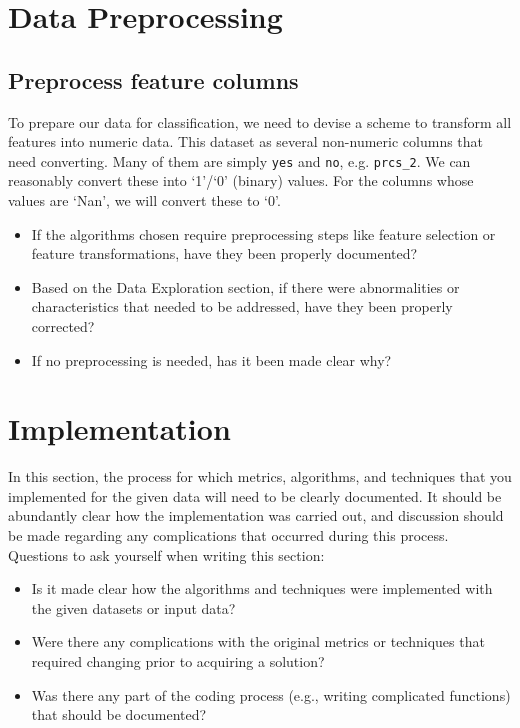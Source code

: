\section*{Data Preprocessing}

\subsection*{Preprocess feature columns}

To prepare our data for classification, we need to devise a scheme to transform all features into numeric data. This dataset as several non-numeric columns that need converting. Many of them are simply \texttt{yes} and \texttt{no}, e.g. \texttt{prcs\_2}. We can reasonably convert these into `1'/`0' (binary) values. For the columns whose values are `Nan', we will convert these to `0'.
\begin{itemize}%
\item If the algorithms chosen require preprocessing steps like feature selection or feature transformations, have they been properly documented?
\item Based on the Data Exploration section, if there were abnormalities or characteristics that needed to be addressed, have they been properly corrected?
\item If no preprocessing is needed, has it been made clear why?
\end{itemize}

\section*{Implementation}
In this section, the process for which metrics, algorithms, and techniques that you implemented for the given data will need to be clearly documented. It should be abundantly clear how the implementation was carried out, and discussion should be made regarding any complications that occurred during this process. Questions to ask yourself when writing this section:
\begin{itemize}%
\item Is it made clear how the algorithms and techniques were implemented with the given datasets or input data?
\item Were there any complications with the original metrics or techniques that required changing prior to acquiring a solution?
\item Was there any part of the coding process (e.g., writing complicated functions) that should be documented?
\end{itemize}


